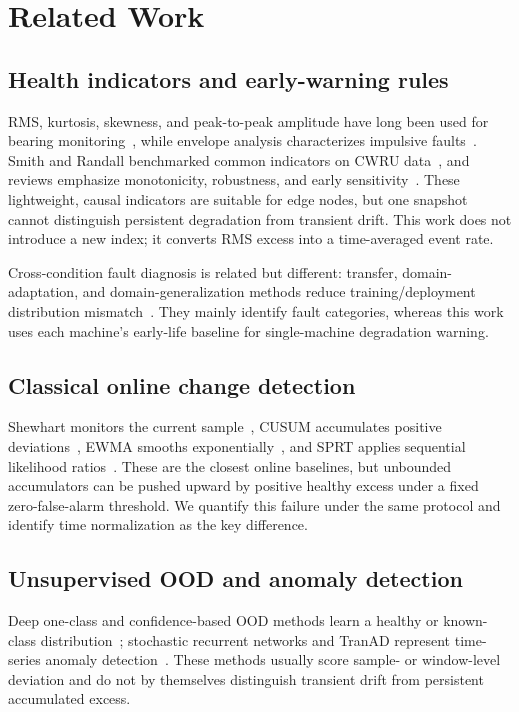 \documentclass[journal]{IEEEtran}
\begin{document}
\section{Related Work}\label{sec:related}
\subsection{Health indicators and early-warning rules}
RMS, kurtosis, skewness, and peak-to-peak amplitude have long been used for bearing monitoring~\cite{dyer1978}, while envelope analysis characterizes impulsive faults~\cite{randall2011}. Smith and Randall benchmarked common indicators on CWRU data~\cite{smith2015}, and reviews emphasize monotonicity, robustness, and early sensitivity~\cite{wangd2018}. These lightweight, causal indicators are suitable for edge nodes, but one snapshot cannot distinguish persistent degradation from transient drift. This work does not introduce a new index; it converts RMS excess into a time-averaged event rate.

Cross-condition fault diagnosis is related but different: transfer, domain-adaptation, and domain-generalization methods reduce training/deployment distribution mismatch~\cite{xiao2024dg}. They mainly identify fault categories, whereas this work uses each machine's early-life baseline for single-machine degradation warning.

\subsection{Classical online change detection}
Shewhart monitors the current sample~\cite{shewhart1931}, CUSUM accumulates positive deviations~\cite{page1954}, EWMA smooths exponentially~\cite{roberts1959}, and SPRT applies sequential likelihood ratios~\cite{wald1945}. These are the closest online baselines, but unbounded accumulators can be pushed upward by positive healthy excess under a fixed zero-false-alarm threshold. We quantify this failure under the same protocol and identify time normalization as the key difference.

\subsection{Unsupervised OOD and anomaly detection}
Deep one-class and confidence-based OOD methods learn a healthy or known-class distribution~\cite{ruff2018,hendrycks2017}; stochastic recurrent networks and TranAD represent time-series anomaly detection~\cite{su2019,tuli2022tranad}. These methods usually score sample- or window-level deviation and do not by themselves distinguish transient drift from persistent accumulated excess.
\end{document}
